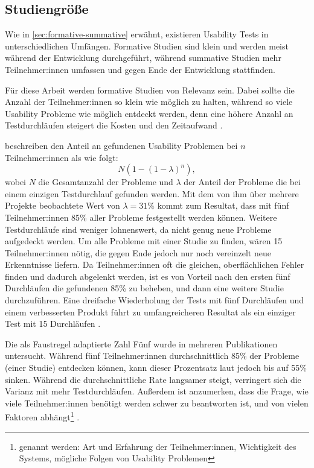 \subsection{Studiengröße}
\label{sec:study-size}

Wie in \ref{sec:formative-summative} erwähnt, existieren Usability Tests in unterschiedlichen Umfängen. Formative Studien sind klein und werden meist während der Entwicklung durchgeführt, während summative Studien mehr Teilnehmer:innen umfassen und gegen Ende der Entwicklung stattfinden.

Für diese Arbeit werden formative Studien von Relevanz sein. Dabei sollte die Anzahl der Teilnehmer:innen so klein wie möglich zu halten, während so viele Usability Probleme wie möglich entdeckt werden, denn eine höhere Anzahl an Testdurchläufen steigert die Kosten und den Zeitaufwand \parencites{faulknerFiveuserAssumption2003, nielsenWhyYou2000}.

\textcite{nielsenMathematicalModel1993} beschreiben den Anteil an gefundenen Usability Problemen bei
$n$ Teilnehmer:innen als wie folgt:
\begin{equation}
  \label{equ:finding-usability-problems}
  N(1-(1-\lambda{})^n),
\end{equation}
wobei $N$ die Gesamtanzahl der Probleme und $\lambda{}$ der Anteil der Probleme die bei einem einzigen Testdurchlauf gefunden werden. Mit dem von ihm über mehrere Projekte beobachtete Wert von $\lambda{}=31\%$ kommt \textcite{nielsenWhyYou2000} zum Resultat, dass mit fünf Teilnehmer:innen 85\% aller Probleme festgestellt werden können. \cite{nielsenWhyYou2000} Weitere Testdurchläufe sind weniger lohnenswert, da nicht genug neue Probleme aufgedeckt werden. Um alle Probleme mit einer Studie zu finden, wären 15 Teilnehmer:innen nötig, die gegen Ende jedoch nur noch vereinzelt neue Erkenntnisse liefern. Da Teilnehmer:innen oft die gleichen, oberflächlichen Fehler finden und dadurch abgelenkt werden, ist es von Vorteil nach den ersten fünf Durchläufen die gefundenen 85\% zu beheben, und dann eine weitere Studie durchzuführen. Eine dreifache Wiederholung der Tests mit fünf Durchläufen und einem verbesserten Produkt führt zu umfangreicheren Resultat als ein einziger Test mit 15 Durchläufen \parencite{nielsenWhyYou2000}.

Die als Faustregel adaptierte Zahl Fünf wurde in mehreren Publikationen untersucht. Während fünf Teilnehmer:innen durchschnittlich 85\% der Probleme (einer Studie) entdecken können, kann dieser Prozentsatz laut \textcite{faulknerFiveuserAssumption2003} jedoch bis auf 55\% sinken. Während die durchschnittliche Rate langsamer steigt, verringert sich die Varianz mit mehr Testdurchläufen. Außerdem ist anzumerken, dass die Frage, wie viele Teilnehmer:innen benötigt werden schwer zu beantworten ist, und von vielen Faktoren abhängt\footnote{genannt werden: Art und Erfahrung der Teilnehmer:innen, Wichtigkeit des Systems, mögliche Folgen von Usability Problemen} \parencite{faulknerFiveuserAssumption2003}.


